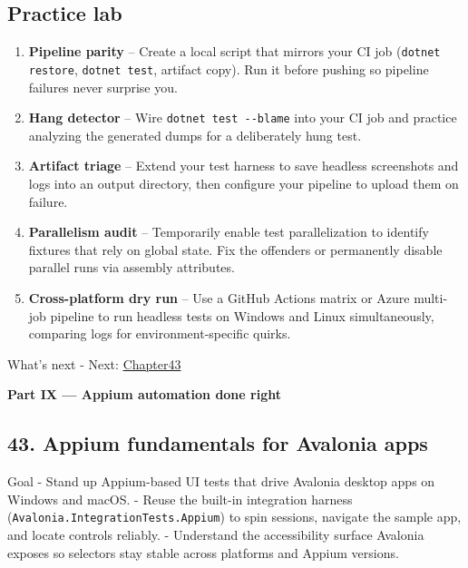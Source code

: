 \subsection{Practice lab}\label{practice-lab-9}

\begin{enumerate}
\def\labelenumi{\arabic{enumi}.}
\tightlist
\item
  \textbf{Pipeline parity} -- Create a local script that mirrors your CI
  job (\passthrough{\lstinline!dotnet restore!},
  \passthrough{\lstinline!dotnet test!}, artifact copy). Run it before
  pushing so pipeline failures never surprise you.
\item
  \textbf{Hang detector} -- Wire
  \passthrough{\lstinline!dotnet test --blame!} into your CI job and
  practice analyzing the generated dumps for a deliberately hung test.
\item
  \textbf{Artifact triage} -- Extend your test harness to save headless
  screenshots and logs into an output directory, then configure your
  pipeline to upload them on failure.
\item
  \textbf{Parallelism audit} -- Temporarily enable test parallelization
  to identify fixtures that rely on global state. Fix the offenders or
  permanently disable parallel runs via assembly attributes.
\item
  \textbf{Cross-platform dry run} -- Use a GitHub Actions matrix or
  Azure multi-job pipeline to run headless tests on Windows and Linux
  simultaneously, comparing logs for environment-specific quirks.
\end{enumerate}

What's next - Next: \href{Chapter43.md}{Chapter43}

\clearpage
{}
{}
\thispagestyle{empty}
\vspace*{\fill}
\begin{center}
{\Huge\bfseries Part IX — Appium automation done right}
\end{center}
\vspace*{\fill}
\clearpage

\newpage

\subsection{43. Appium fundamentals for Avalonia
apps}\label{appium-fundamentals-for-avalonia-apps}

Goal - Stand up Appium-based UI tests that drive Avalonia desktop apps
on Windows and macOS. - Reuse the built-in integration harness
(\passthrough{\lstinline!Avalonia.IntegrationTests.Appium!}) to spin
sessions, navigate the sample app, and locate controls reliably. -
Understand the accessibility surface Avalonia exposes so selectors stay
stable across platforms and Appium versions.

